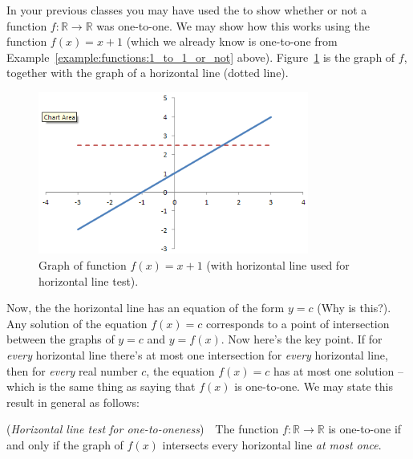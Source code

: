 \begin{rem}\label{rem:onetoone}
In your previous classes you may have used the   to show whether or not a function $f: \mathbb{R} \rightarrow \mathbb{R}$ was one-to-one.  We may show how this works using the function $f(x)=x +1$ (which we already know is one-to-one from Example~\ref{example:functions:1_to_1_or_not} above).  Figure~\ref{fig:xplus1} is the graph of $f$, together with the graph of a  horizontal line (dotted line).
\begin{figure}[h]
\includegraphics[width=3.5in]{images/xplus1.png}
\caption{Graph of function $f(x)=x +1$ (with horizontal line used for horizontal line test).}
\label{fig:xplus1}
\end{figure}

Now, the  the horizontal line has an equation of the form $y=c$ (Why is this?). Any solution of the equation $f(x)=c$ corresponds to a point of intersection between the graphs of $y=c$ and $y=f(x)$. Now here's the key point.  If for \emph{every} horizontal line there's at most one intersection for \emph{every} horizontal line, then  for \emph{every} real number $c$, the equation $f(x)=c$ has at most one solution --which is the same thing as saying that $f(x)$ is one-to-one. We may state this result in general as follows:
\bigskip

\noindent 
(\emph{Horizontal line test for one-to-oneness})~~The function $f:\mathbb{R} \rightarrow \mathbb{R}$ is one-to-one if and only if the graph of $f(x)$ intersects every horizontal line \emph{at most once}.
\bigskip


\end{rem}
